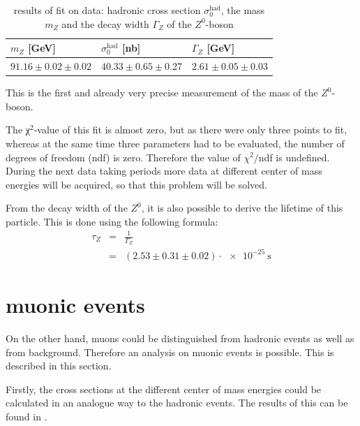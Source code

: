 \documentclass[epj,nopacs]{svjour}
\begin{document}
\begin{table}[h]
\begin{center}
\begin{tabular}{|l|l|l|}
\hline
$m_Z$ [\si{\GeV}] & $σ_0^{\mathrm{had}}$  [\si{\nano\barn}] & $Γ_Z$ [\si{\GeV}]\\
\hline
$91.16 \pm 0.02 \pm 0.02$ & $40.33 \pm 0.65 \pm 0.27$ & $2.61 \pm 0.05 \pm 0.03$\\
\hline
\end{tabular}
\vspace*{0.3cm}
\caption{\baselineskip=0.38cm results of fit on data: hadronic cross section $σ_0^{\mathrm{had}}$, the mass $m_Z$ and the decay width $Γ_Z$ of the $Z^0$-boson}
\label{tab:results}
\end{center}
\vspace*{-0.5cm}
\end{table}
This is the first and already very precise measurement of the mass of the $Z^0$-boson. 

The χ$^2$-value of this fit is almost zero, but as there were only three points to fit, whereas at the same time three parameters had to be evaluated, the number of degrees of freedom (ndf) is zero. Therefore the value of $χ^2/$ndf is undefined. During the next data taking periods more data at different center of mass energies will be acquired, so that this problem will be solved.

From the decay width of the $Z^0$, it is also possible to derive the lifetime of this particle. This is done using the following formula:
\begin{eqnarray}
τ_Z &=& \frac{1}{Γ_Z}\\
&=& (2.53 \pm 0.31 \pm 0.02) \cdot \SI{e-25}{\second}
\end{eqnarray}

\section{muonic events}

On the other hand, muons could be distinguished from hadronic events as well as from background. Therefore an analysis on muonic events is possible. This is described in this section.

Firstly, the cross sections at the different center of mass energies could be calculated in an analogue way to the hadronic events. The results of this can be found in .
\end{document}
